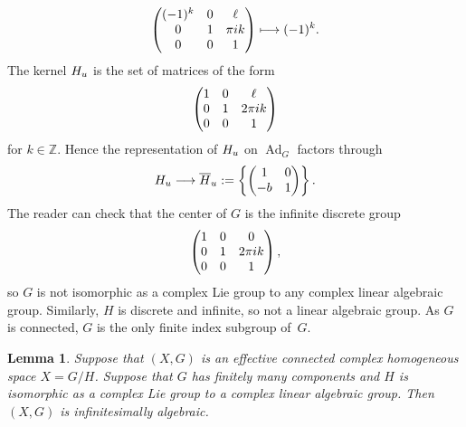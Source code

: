 \documentclass[11pt]{article}
\numberwithin{equation}{section}
\numberwithin{equation}{section}
\newtheorem{Lemma}[Theorem]{Lemma}
\newcommand{\Z}{\mathbb{Z}}
\DeclareMathOperator{\Ad}{Ad}
\begin{document}
\begin{Example}
\[\begin{pmatrix}
(-1)^k & 0 & \ell \\
0 & 1 & \pi {\rm i} k \\
0 & 0 & 1
\end{pmatrix}
 \longmapsto (-1)^k.
\]
The kernel $\urad{H}$ is the set of matrices of the form
\[
\begin{pmatrix}
1 & 0 & \ell \\
0 & 1 & 2\pi {\rm i} k \\
0 & 0 & 1
\end{pmatrix}
\]
for $k \in \Z$.
Hence the representation of $\urad{H}$ on $\Ad_G$ factors through
\[
\urad{H} \longrightarrow \urad{\overline{H}} := \left\{\begin{pmatrix}1&0\\-b&1\end{pmatrix}\right\}.
\]
The reader can check that the center of $G$ is the infinite discrete group
\[
\begin{pmatrix}
1 & 0 & 0 \\
0 & 1 & 2\pi {\rm i} k \\
0 & 0 & 1
\end{pmatrix},
\]
so $G$ is not isomorphic as a complex Lie group to any complex linear algebraic group.
Similarly, $H$ is discrete and infinite, so not a linear algebraic group.
As $G$ is connected, $G$ is the only finite index subgroup of~$G$.
\end{Example}

\begin{Lemma}
Suppose that $(X, G)$ is an effective connected complex homogeneous space $X=G/H$.
Suppose that $G$ has finitely many components and $H$ is isomorphic as a complex Lie group to a complex linear algebraic group.
Then $(X, G)$ is infinitesimally algebraic.
\end{Lemma}
\end{document}
